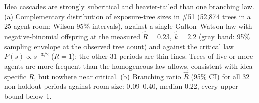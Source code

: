 \caption{Idea cascades are strongly subcritical and heavier-tailed than one branching law. (a) Complementary distribution of exposure-tree sizes in \#51 (52,874 trees in a 25-agent room; Wilson 95\% intervals), against a single Galton--Watson law with negative-binomial offspring at the measured $\hat R=0.23$, $\hat k=2.2$ (gray band: 95\% sampling envelope at the observed tree count) and against the critical law $P(s)\propto s^{-3/2}$ ($R=1$); the other 31 periods are thin lines. Trees of five or more agents are more frequent than the homogeneous law allows, consistent with idea-specific $R$, but nowhere near critical. (b) Branching ratio $\hat R$ (95\% CI) for all 32 non-holdout periods against room size: 0.09--0.40, median 0.22, every upper bound below 1.}
\label{fig:H34}

